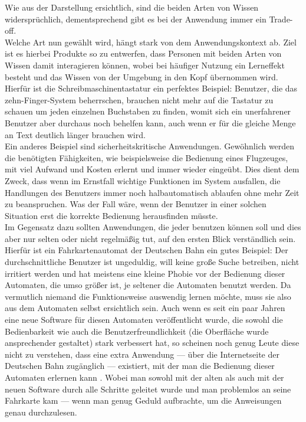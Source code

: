\documentclass[parskip,headsepline, headtopline, %
footsepline, oneside, 12pt, headings=small]{scrreprt}
\begin{document}
Wie aus der Darstellung ersichtlich, sind die beiden Arten von Wissen widersprüchlich, dementsprechend gibt es bei der Anwendung immer ein Trade-off.\\
Welche Art nun gewählt wird, hängt stark von dem Anwendungskontext ab. Ziel ist es hierbei Produkte so zu entwerfen, dass Personen mit beiden Arten von Wissen damit interagieren können, wobei bei häufiger Nutzung ein Lerneffekt besteht und das Wissen von der Umgebung in den Kopf übernommen wird. Hierfür ist die Schreibmaschinentastatur ein perfektes Beispiel: Benutzer, die das zehn-Finger-System beherrschen, brauchen nicht mehr auf die Tastatur zu schauen um jeden einzelnen Buchstaben zu finden, womit sich ein unerfahrener Benutzer aber durchaus noch behelfen kann, auch wenn er für die gleiche Menge an Text deutlich länger brauchen wird.\\
Ein anderes Beispiel sind sicherheitskritische Anwendungen. Gewöhnlich werden die benötigten Fähigkeiten, wie beispielsweise die Bedienung eines Flugzeuges, mit viel Aufwand und Kosten erlernt und immer wieder eingeübt. Dies dient dem Zweck, dass wenn im Ernstfall wichtige Funktionen im System ausfallen, die Handlungen des Benutzers immer noch halbautomatisch ablaufen ohne mehr Zeit zu beanspruchen. Was der Fall wäre, wenn der Benutzer in einer solchen Situation erst die korrekte Bedienung herausfinden müsste.\\
Im Gegensatz dazu sollten Anwendungen, die jeder benutzen können soll und dies aber nur selten oder nicht regelmäßig tut, auf den ersten Blick verständlich sein. Hierfür ist ein Fahrkartenautomat der Deutschen Bahn ein gutes Beispiel: Der durchschnittliche Benutzer ist ungeduldig, will keine große Suche betreiben, nicht irritiert werden und hat meistens eine kleine Phobie vor der Bedienung dieser Automaten, die umso größer ist, je seltener die Automaten benutzt werden. Da vermutlich niemand die Funktionsweise auswendig lernen möchte, muss sie also aus dem Automaten selbst ersichtlich sein. Auch wenn es seit ein paar Jahren eine neue Software für diesen Automaten veröffentlicht wurde, die sowohl die Bedienbarkeit wie auch die Benutzerfreundlichkeit (die Oberfläche wurde ansprechender gestaltet) stark verbessert hat, so scheinen noch genug Leute diese nicht zu verstehen, dass eine extra Anwendung --- über die Internetseite der Deutschen Bahn zugänglich --- existiert, mit der man die Bedienung dieser Automaten erlernen kann \cite{bahn}. Wobei man sowohl mit der alten als auch mit der neuen Software durch alle Schritte geleitet wurde und man problemlos an seine Fahrkarte kam --- wenn man genug Geduld aufbrachte, um die Anweisungen genau durchzulesen.
\end{document}
